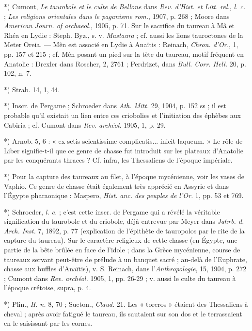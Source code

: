 \documentclass[a4paper, 11pt, oneside, polutonikogreek, french]{article}
\begin{document}
*) Cumont, \emph{Le taurobole et le culte de Bellone} dans \emph{Rev. d'Hist. et Litt. rel.}, \emph{l. c.} ; \emph{Les religions orientales dans le paganisme rom.}, 1907, p. 268 ; Moore dans \emph{American Journ. of archaeol.}, 1905, p. 71. Sur le sacrifice du taureau à Mâ et Rhéa en Lydie : Steph. Byz., s. v. \emph{Mastaura} ; cf. aussi les lions tauroctones de la Meter Oreia. --- Mên est associé en Lydie à Anaïtis : Reinach, \emph{Chron. d'Or.}, 1, pp. 157 et 215 ; cf. Mên posant un pied sur la tète du taureau, motif fréquent en Anatolie : Drexler dans Roscher, 2, 2761 ; Perdrizet, dans \emph{Bull. Corr. Hell.} 20, p. 102, n. 7.

*) Strab. 14, 1, 44.

*) Inscr. de Pergame ; Schroeder dans \emph{Ath. Mitt.}  29, 1904, p. 152 ss ; il est probable qu'il existait un lien entre ces criobolies et l'initiation des éphèbes aux Cabiria ; cf. Cumont dans \emph{Rev. archéol.} 1905, 1, p. 29.

*) Arnob. 5, 6 : « ex setis scientissime complicatis... inicit laqueum. » Le rôle de Liber signifie-t-il que ce genre de chasse fut introduit sur les plateaux d'Anatolie par les conquérants thraces ? Cf. infra, les Thessaliens de l'époque impériale.

*) Pour la capture des taureaux au filet, à l'époque mycénienne, voir les vases de Vaphio. Ce genre de chasse était également très apprécié en Assyrie et dans l'Égypte pharaonique : Maspero, \emph{Hist. anc. des peuples de l'Or.} 1, pp. 53 et 769.

*) Schroeder, \emph{l. c.} ; c'est cette inscr. de Pergame qui a révélé la véritable signification du taurobole et du criobole, déjà entrevue par Meyer dans \emph{Jahrb. d. Arch. Inst.} 7, 1892, p. 77 (explication de l'épithète de tauropolos par le rite de la capture du taureau). Sur le caractère religieux de cette chasse (en Égypte, une partie de la bête brûlée en face de l'idole ; dans la Grèce mycénienne, course de taureaux servant peut-être de prélude à un banquet sacré ; au-delà de l'Euphrate, chasse aux buffles d'Anaïtis), v. S. Reinach, dans l'\emph{Anthropologie}, 15, 1904, p. 272 ; Cumont dans \emph{Rev. archéol.} 1905, 1, pp. 26-29 ; v. aussi le culte du taureau à l'époque crétoise, supra, p. 4.

*) Plin., \emph{H. n.} 8, 70 ; Sueton., \emph{Claud.} 21. Les « toreros » étaient des Thessaliens à cheval ; après avoir fatigué le taureau, ils sautaient sur son dos et le terrassaient en le saisissant par les cornes.
\end{document}
